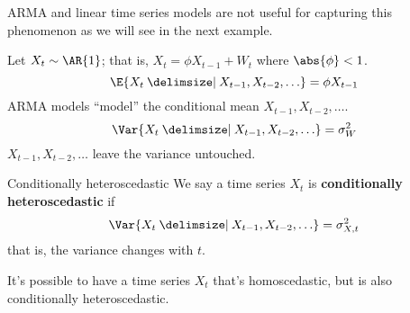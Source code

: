ARMA and linear time series models are not useful for capturing this phenomenon
as we will see in the next example.
\begin{Example}{}{}
    Let $ X_t \sim \AR{1} $; that is, $ X_t=\phi X_{t-1}+W_t $ where $ \abs{\phi}<1 $.
    \[ \E{X_t\given X_{t-1},X_{t-2},\ldots}=\phi X_{t-1} \]
    ARMA models ``model'' the conditional mean $ X_{t-1},X_{t-2},\ldots $.
    \[ \Var{X_t\given X_{t-1},X_{t-2},\ldots}=\sigma_W^2 \]
    $ X_{t-1},X_{t-2},\ldots $ leave the variance untouched.
\end{Example}
\begin{Definition}{Conditionally heteroscedastic}{}
    We say a time series $ X_t $ is \textbf{conditionally heteroscedastic}
    if
    \[ \Var{X_t\given X_{t-1},X_{t-2},\ldots}=\sigma_{X,t}^2 \]
    that is, the variance changes with $ t $.
\end{Definition}
It's possible to have a time series $ X_t $ that's
homoscedastic, but is also conditionally heteroscedastic.

